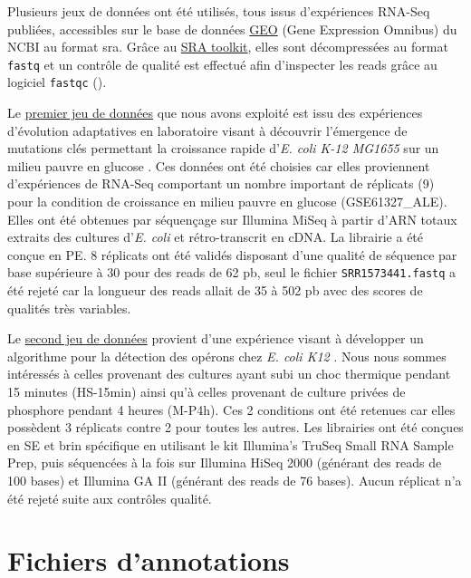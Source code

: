\documentclass[12pt,a4paper]{report}
\begin{document}
\begin{onehalfspace}
Plusieurs jeux de données ont été utilisés, tous issus d'expériences RNA-Seq publiées, accessibles sur le base de données \href{http://www.ncbi.nlm.nih.gov/geo/}{GEO} (Gene Expression Omnibus) du NCBI au format \gls{sra}. Grâce au \href{http://www.ncbi.nlm.nih.gov/books/NBK158900/#SRA_download.how_do_i_use_the_sra_toolki}{SRA toolkit}, elles sont décompressées au format \texttt{fastq} et un contrôle de qualité est effectué afin d'inspecter les reads grâce au logiciel \texttt{fastqc} ().

Le \href{http://www.ncbi.nlm.nih.gov/geo/query/acc.cgi?acc=GSE61327}{premier jeu de données} que nous avons exploité est issu des expériences d'évolution adaptatives en laboratoire visant à découvrir l'émergence de mutations clés permettant la croissance rapide d'\textit{E. coli K-12 MG1655} sur un milieu pauvre en glucose \citep{Lacroix2014}. Ces données ont été choisies car elles proviennent d'expériences de RNA-Seq comportant un nombre important de réplicats (9) pour la condition de croissance en milieu pauvre en glucose (GSE61327\_ALE). Elles ont été obtenues par séquençage sur Illumina MiSeq à partir d'ARN totaux extraits des cultures d'\textit{E. coli} et rétro-transcrit en cDNA. La librairie a été conçue en \gls{PE}. 8 réplicats ont été validés disposant d'une qualité de séquence par base supérieure à 30 pour des reads de 62 pb, seul le fichier \texttt{SRR1573441.fastq} a été rejeté car la longueur des reads allait de 35 à 502 pb avec des scores de qualités très variables.

Le \href{http://bioinfolab.uncc.edu/TruHmm_package/raw_data/}{second jeu de données} provient d'une expérience visant à développer un algorithme pour la détection des opérons chez \textit{E. coli K12} \citep{Li2013}. Nous nous sommes intéressés à celles provenant des cultures ayant subi un choc thermique pendant 15 minutes (HS-15min) ainsi qu'à celles provenant de culture privées de phosphore pendant 4 heures (M-P4h). Ces 2 conditions ont été retenues car elles possèdent 3 réplicats contre 2 pour toutes les autres. Les librairies ont été conçues en \gls{SE} et brin spécifique en utilisant le kit Illumina’s TruSeq Small RNA Sample Prep, puis séquencées à la fois sur Illumina HiSeq 2000 (générant des reads de 100 bases) et Illumina GA II (générant des reads de 76 bases). Aucun réplicat n'a été rejeté suite aux contrôles qualité.

\section*{Fichiers d'annotations}


\end{onehalfspace}
\end{document}
